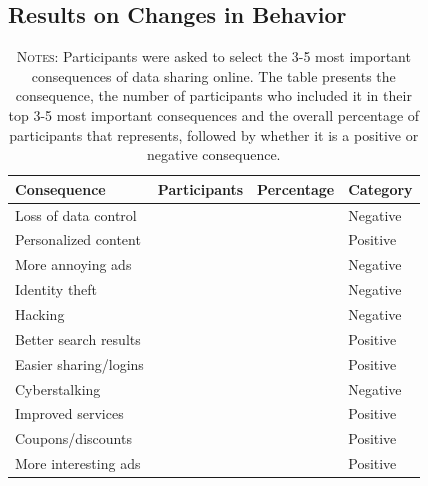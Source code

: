 \documentclass[12pt]{article}
\theoremstyle{definition}
\theoremstyle{remark}
\begin{document}
\begin{appendix}
\subsection{Results on Changes in Behavior}


\begin{table}[H]
\centering
\caption{Data Sharing Purposes}\label{tab:data_sharing_purpose}
\begin{tabular}{lrrl}
  \hline
Consequence & Participants & Percentage & Category \\ 
  \hline
Loss of data control & \dataPurposeLossControlN{} & \dataPurposeLossControlPct{} & Negative \\ 
  Personalized content & \dataPurposePersonalizedN{} & \dataPurposePersonalizedPct{} & Positive \\ 
  More annoying ads & \dataPurposeAnnoyingAdsN{} & \dataPurposeAnnoyingAdsPct{} & Negative \\ 
  Identity theft & \dataPurposeIdentityTheftN{} & \dataPurposeIdentityTheftPct{} & Negative \\ 
  Hacking & \dataPurposeHackingN{} & \dataPurposeHackingPct{} & Negative \\ 
  Better search results & \dataPurposeBetterSearchN{} & \dataPurposeBetterSearchPct{} & Positive \\ 
  Easier sharing/logins & \dataPurposeEasierSharingN{} & \dataPurposeEasierSharingPct{} & Positive \\ 
  Cyberstalking & \dataPurposeCyberstalkingN{} & \dataPurposeCyberstalkingPct{} & Negative \\ 
  Improved services & \dataPurposeImprovedServicesN{} & \dataPurposeImprovedServicesPct{} & Positive \\ 
  Coupons/discounts & \dataPurposeCouponsN{} & \dataPurposeCouponsPct{} & Positive \\ 
  More interesting ads & \dataPurposeInterestingAdsN{} & \dataPurposeInterestingAdsPct{} & Positive \\ 
   \hline
\end{tabular}
\caption*{\scriptsize \textsc{Notes}: Participants were asked to select the 3-5 most important consequences of data sharing online. The table presents the consequence, the number of participants who included it in their top 3-5 most important consequences and the overall percentage of participants that represents, followed by whether it is a positive or negative consequence.}
\end{table}


\end{appendix}
\end{document}
